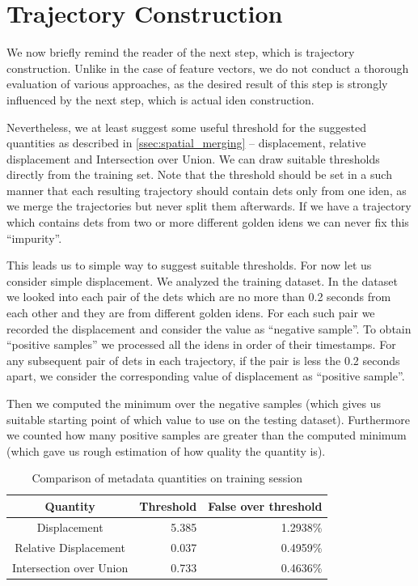 \section{Trajectory Construction}

We now briefly remind the reader of the next step, which is trajectory construction. Unlike in the case of feature vectors, we do not conduct a thorough evaluation of various approaches, as the desired result of this step is strongly influenced by the next step, which is actual \gls{iden} construction.

Nevertheless, we at least suggest some useful threshold for the suggested quantities as described in \autoref{ssec:spatial_merging} -- displacement, relative displacement and Intersection over Union. We can draw suitable thresholds directly from the training set. Note that the threshold should be set in a such manner that each resulting trajectory should contain \glspl{det} only from one \gls{iden}, as we merge the trajectories but never split them afterwards. If we have a trajectory which contains \glspl{det} from two or more different golden \glspl{iden} we can never fix this ``impurity''.

This leads us to simple way to suggest suitable thresholds. For now let us consider simple displacement. We analyzed the training dataset. In the dataset we looked into each pair of the \glspl{det} which are no more than 0.2 seconds from each other and they are from different golden \glspl{iden}. For each such pair we recorded the displacement and consider the value as ``negative sample''. To obtain ``positive samples'' we processed all the \glspl{iden} in order of their timestamps. For any subsequent pair of \glspl{det} in each trajectory, if the pair is less the 0.2 seconds apart, we consider the corresponding value of displacement as ``positive sample''.

Then we computed the minimum over the negative samples (which gives us suitable starting point of which value to use on the testing dataset). Furthermore we counted how many positive samples are greater than the computed minimum (which gave us rough estimation of how quality the quantity is).

\begin{table}[]
    \centering
    \begin{tabular}{c|r|r}
         Quantity & Threshold & False over threshold  \\ \hline
         Displacement & 5.385 & 1.2938\% \\
         Relative Displacement & 0.037 & 0.4959\% \\
         Intersection over Union & 0.733 & 0.4636\%
    \end{tabular}
    \caption{Comparison of metadata quantities on training session}
    \label{tab:metadata_comparison}
\end{table}

